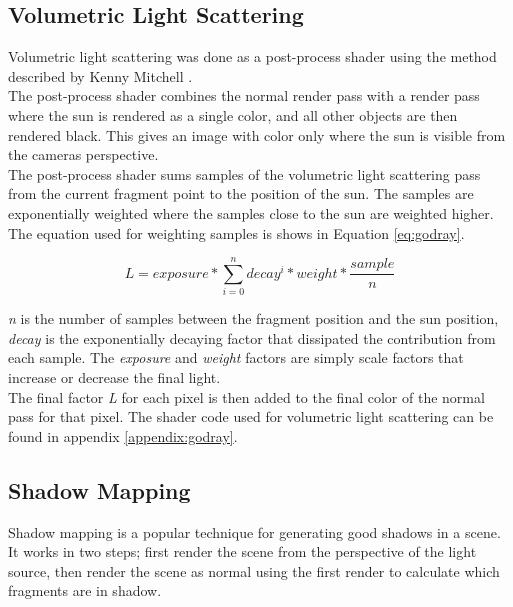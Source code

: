 \documentclass{article}
\begin{document}
  		\subsection{Volumetric Light Scattering}
  		
  			Volumetric light scattering was done as a post-process shader using the method described by Kenny Mitchell \citep{mitchell}. \\
  			
  			The post-process shader combines the normal render pass with a render pass where the sun is rendered as a single color, and all other objects are then rendered black. This gives an image with color only where the sun is visible from the cameras perspective. \\
  			
  			The post-process shader sums samples of the volumetric light scattering pass from the current fragment point to the position of the sun. The samples are exponentially weighted where the samples close to the sun are weighted higher. The equation used for weighting samples is shows in Equation \ref{eq:godray}. 
  			
  			\begin{equation}
  				\label{eq:godray}
  				L = exposure * \sum_{i = 0}^{n} decay^i * weight * \frac{sample}{n}
  			\end{equation}
  			
  			\textit{n} is the number of samples between the fragment position and the sun position, \textit{decay} is the exponentially decaying factor that dissipated the contribution from each sample. The \textit{exposure} and \textit{weight} factors are simply scale factors that increase or decrease the final light. \\
  			
  			The final factor \textit{L} for each pixel is then added to the final color of the normal pass for that pixel. The shader code used for volumetric light scattering can be found in appendix \ref{appendix:godray}.
  		
  		\subsection{Shadow Mapping}
  			Shadow mapping is a popular technique for generating good shadows in a scene. It works in two steps; first render the scene from the perspective of the light source, then render the scene as normal using the first render to calculate which fragments are in shadow. \citep{ragnemalm2015so} \\
  			
\end{document}
